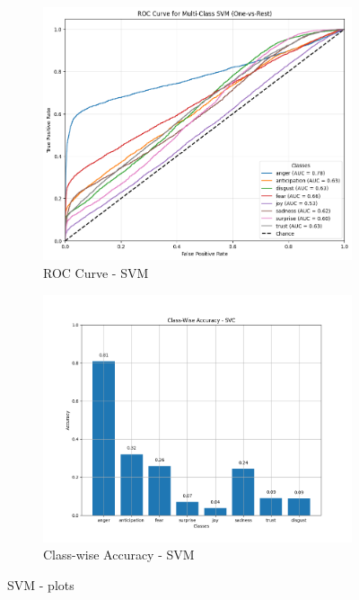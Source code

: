 \begin{figure}[H]
    \centering
    \begin{subfigure}{0.45\textwidth}
        \centering
        \includegraphics[width=\textwidth]{pictures/roc_svc.png}
        \caption{ROC Curve - SVM}
        \label{fig:roc_svm}
    \end{subfigure}
    \begin{subfigure}{0.53\textwidth}
        \centering
        \includegraphics[width=\textwidth]{pictures/class_accuracy_SVC.png}
        \caption{Class-wise Accuracy - SVM}
        \label{fig:cwa_svm}
    \end{subfigure}
    \caption{SVM - plots}
    \label{fig:svm_metrics}
\end{figure}

